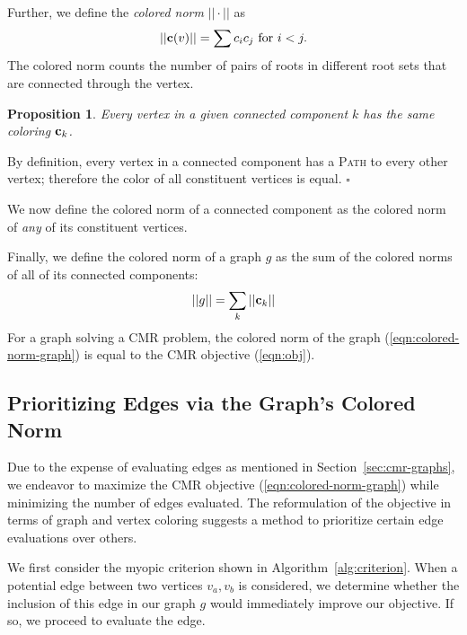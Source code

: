 \documentclass{report}
\newcommand{\cdnote}[1]{{\xxnote{CD}{blue}{#1}}}
\newcommand{\xxnote}[3]{}
\renewcommand{\xxnote}[3]{\color{#2}{#1: #3}}
\newtheorem{proposition}{Proposition}
\newenvironment{proof}[1][Proof]{\begin{trivlist}
   \item[\hskip \labelsep {\bfseries #1}]}{\hfill$\square$\end{trivlist}}
\begin{document}
Further, we define the \emph{colored norm} $||\cdot||$ as
\begin{equation}
   ||{\bf c}(v)|| = \sum c_i c_j \mbox{ for } i < j.
\end{equation}
The colored norm counts the number of pairs of roots in different root sets
that are connected through the vertex. 

\begin{proposition}
Every vertex in a given connected component $k$ has the same coloring
${\bf c}_k$.
\end{proposition}
\begin{proof}
By definition, every vertex in a connected component has a
\textsc{Path} to every other vertex;
therefore the color of all constituent vertices is equal.
\end{proof}

We now define the colored norm of a connected component as the colored norm
of \emph{any} of its constituent vertices.

Finally, we define the colored norm of a graph $g$
as the sum of the colored norms of all of its connected components:
\begin{equation}
   \label{eqn:colored-norm-graph}
   ||g|| = \sum_k ||{\bf c}_k||
\end{equation}
For a graph solving a CMR problem,
the colored norm of the graph (\ref{eqn:colored-norm-graph})
is equal to the CMR objective (\ref{eqn:obj}).

\subsection{Prioritizing Edges via the Graph's Colored Norm}

Due to the expense of evaluating edges
as mentioned in Section~\ref{sec:cmr-graphs},
we endeavor to maximize the CMR objective
(\ref{eqn:colored-norm-graph})
while minimizing the number of edges evaluated.
The reformulation of the objective in terms of graph and vertex coloring
suggests a method to prioritize certain edge evaluations over others.

We first consider the myopic criterion
shown in Algorithm~\ref{alg:criterion}.
When a potential edge between two vertices $v_a,v_b$ is considered,
we determine whether the inclusion of this edge in our graph $g$
would immediately improve our objective.
If so, we proceed to evaluate the edge.
\end{document}
